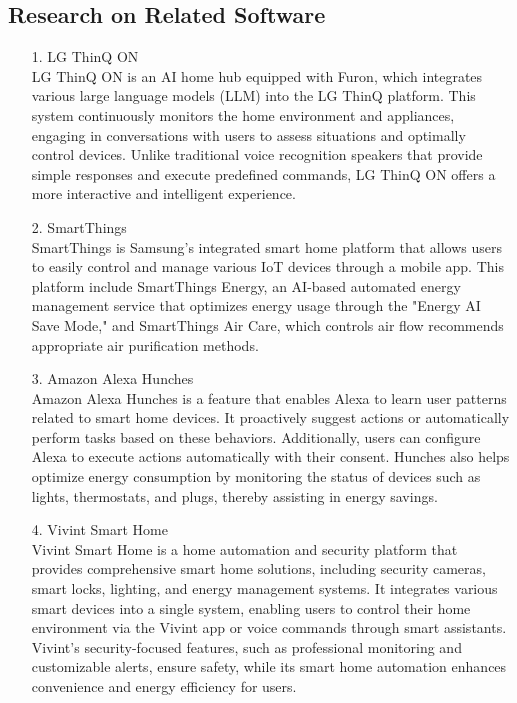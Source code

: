 \documentclass[conference]{IEEEtran}
\begin{document}
\subsection{Research on Related Software}

\begin{itemize}
\item [1.]LG ThinQ ON\\
LG ThinQ ON is an AI home hub equipped with Furon, which integrates various large language models (LLM) into the LG ThinQ platform. This system continuously monitors the home environment and appliances, engaging in conversations with users to assess situations and optimally control devices. Unlike traditional voice recognition speakers that provide simple responses and execute predefined commands, LG ThinQ ON offers a more interactive and intelligent experience. \\
\item [2.]SmartThings\\
SmartThings is Samsung’s integrated smart home platform that allows users to easily control and manage various IoT devices through a mobile app. This platform include SmartThings Energy, an AI-based automated energy management service that optimizes energy usage through the "Energy AI Save Mode," and SmartThings Air Care, which controls air flow recommends appropriate air purification methods.\\
\item [3.]Amazon Alexa Hunches\\
Amazon Alexa Hunches is a feature that enables Alexa to learn user patterns related to smart home devices. It proactively suggest actions or automatically perform tasks based on these behaviors. Additionally, users can configure Alexa to execute actions automatically with their consent. Hunches also helps optimize energy consumption by monitoring the status of devices such as lights, thermostats, and plugs, thereby assisting in energy savings.
\\
\item [4.]Vivint Smart Home\\
Vivint Smart Home is a home automation and security platform that provides comprehensive smart home solutions, including security cameras, smart locks, lighting, and energy management systems. It integrates various smart devices into a single system, enabling users to control their home environment via the Vivint app or voice commands through smart assistants. Vivint's security-focused features, such as professional monitoring and customizable alerts, ensure safety, while its smart home automation enhances convenience and energy efficiency for users.

\end{itemize}
\end{document}

